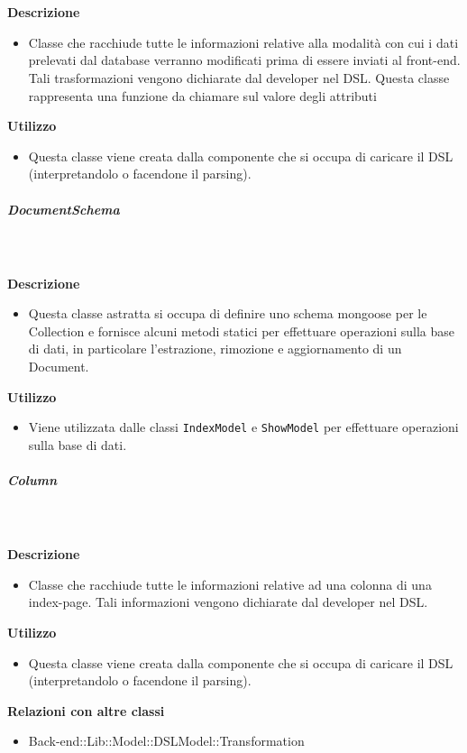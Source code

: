 				\textbf{\\ \\ Descrizione} 
					\begin{itemize}
						\item[] Classe che racchiude tutte le informazioni relative alla modalità con cui i dati prelevati dal database verranno modificati prima di essere inviati al front-end.
Tali trasformazioni vengono dichiarate dal developer nel DSL. Questa classe rappresenta una funzione da chiamare sul valore degli attributi
					\end{itemize}      
				\textbf{Utilizzo}  
					\begin{itemize}
						\item[] Questa classe viene creata dalla componente che si occupa di caricare il DSL (interpretandolo o facendone il parsing).
					\end{itemize}
			\subparagraph{DocumentSchema}
				
				\textbf{\\ \\ Descrizione} 
					\begin{itemize}
						\item[] Questa classe astratta si occupa di definire uno schema mongoose per le Collection e fornisce alcuni metodi statici per effettuare operazioni sulla base di dati, in particolare l'estrazione, rimozione e aggiornamento di un Document.
					\end{itemize}      
				\textbf{Utilizzo}  
					\begin{itemize}
						\item[] Viene utilizzata dalle classi \texttt{IndexModel} e \texttt{ShowModel} per effettuare operazioni sulla base di dati.
					\end{itemize}
			\subparagraph{Column}
				
				\textbf{\\ \\ Descrizione} 
					\begin{itemize}
						\item[] Classe che racchiude tutte le informazioni relative ad una colonna di una index-page. Tali informazioni vengono dichiarate dal developer nel DSL.
					\end{itemize}      
				\textbf{Utilizzo}  
					\begin{itemize}
						\item[] Questa classe viene creata dalla componente che si occupa di caricare il DSL (interpretandolo o facendone il parsing).
					\end{itemize}
					\textbf{Relazioni con altre classi}
					\begin{itemize}
							\item{Back-end::Lib::Model::DSLModel::Transformation}
					\end{itemize}
